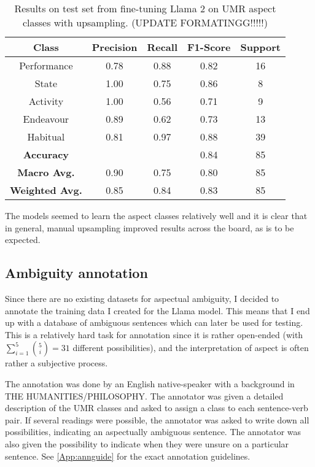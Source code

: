 \begin{table}
    \centering
    \begin{tabular}{|c|c|c|c|c|}\hline
        Class & Precision & Recall & F1-Score & Support \\ \hline
        Performance & 0.78 & 0.88 & 0.82 & 16\\ \hline
        State & 1.00 & 0.75 & 0.86 & 8\\\hline
        Activity & 1.00 & 0.56 & 0.71 & 9\\\hline
        Endeavour & 0.89 & 0.62 & 0.73 & 13\\\hline
        Habitual & 0.81 & 0.97 & 0.88 & 39\\ \hline \hline
        \textbf{Accuracy} &  &  & 0.84 & 85 \\ \hline
        \textbf{Macro Avg.} & 0.90  & 0.75 & 0.80 & 85 \\ \hline
        \textbf{Weighted Avg.} & 0.85  & 0.84 & 0.83 & 85 \\ \hline

    \end{tabular}
    \caption{Results on test set from fine-tuning Llama 2 on UMR aspect classes with upsampling. (UPDATE FORMATINGG!!!!!)}
\end{table}
\label{llama_results_upsampling}

The models seemed to learn the aspect classes relatively well and it is clear that in general, manual upsampling improved results across the board, as is to be expected.

\subsection{Ambiguity annotation}
Since there are no existing datasets for aspectual ambiguity, I decided to annotate the training data I created for the Llama model. This means that I end up with a database of ambiguous sentences which can later be used for testing. This is a relatively hard task for annotation since it is rather open-ended (with $\sum_{i=1}^{5} \binom{5}{i}=31$ different possibilities), and the interpretation of aspect is often rather a subjective process.

The annotation was done by an English native-speaker with a background in THE HUMANITIES/PHILOSOPHY. The annotator was given a detailed description of the UMR classes and asked to assign a class to each sentence-verb pair. If several readings were possible, the annotator was asked to write down all possibilities, indicating an aspectually ambiguous sentence. The annotator was also given the possibility to indicate when they were unsure on a particular sentence. See \ref{App:annguide} for the exact annotation guidelines.

